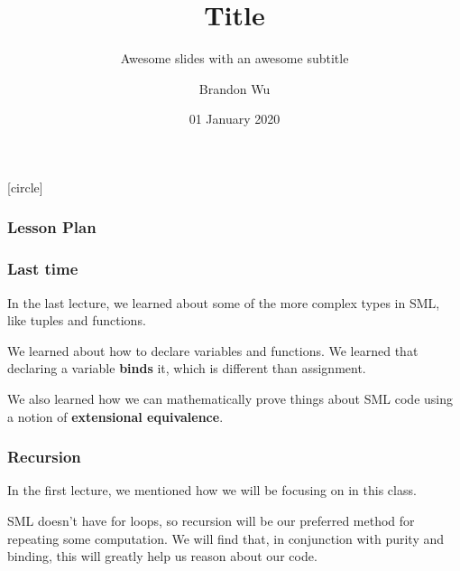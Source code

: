 \documentclass[aspectratio=169]{beamer}
\title{Title} %
\subtitle{Awesome slides with an awesome subtitle} %
\date{01 January 2020} %
\author{Brandon Wu} %
\newif\ifcolorlambda
\begin{document}
\ifweb
    \renewcommand{\pause}{}
\fi

[circle]

{
\begin{frame}[plain]
    \colorlambdatrue
    \titlepage
\end{frame}
}

\begin{frame}[fragile]
  \frametitle{Lesson Plan}

  \tableofcontents
\end{frame}

\begin{frame}[fragile]
  \frametitle{Last time}

  In the last lecture, we learned about some of the more complex types in 
  SML, like tuples and functions. 

  \vspace{\fill}
  
  We learned about how to declare variables and functions. We learned that declaring
  a variable \textbf{binds} it, which is different than assignment. 
  
  \vspace{\fill}

  We also learned how we can mathematically prove things 
  about SML code using a notion of \textbf{extensional equivalence}. 
\end{frame}


\begin{frame}[fragile]
  \frametitle{Recursion}

  In the first lecture, we mentioned how we will be focusing on
   in this class.

  \vspace{\fill}


  \vspace{5pt}


  \vspace{\fill}

  SML doesn't have for loops, so recursion will be our preferred method
  for repeating some computation. We will find that, in conjunction with
  purity and binding, this will greatly help us reason about our code. 
\end{frame}
\end{document}
